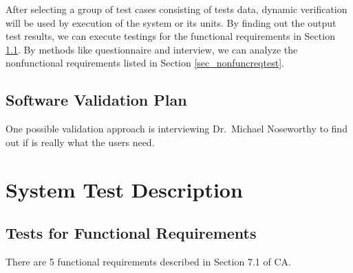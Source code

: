 \documentclass[12pt, titlepage]{article}
\begin{document}
    After selecting a group of test cases consisting of tests data, dynamic
verification will be used by execution of the system or its units. By finding
out the output test results, we can execute testings for the functional
requirements in Section \ref{sec_funcreqtest}. By methods like questionnaire and
interview, we can analyze the nonfunctional requirements listed in Section
\ref{sec_nonfuncreqtest}.

\subsection{Software Validation Plan}

One possible validation approach is interviewing Dr.\ Michael Noseworthy
 to find out if \progname{} is really what the users need.  

\section{System Test Description} \label{sec_systestdescri}

\subsection{Tests for Functional Requirements} \label{sec_funcreqtest}

There are 5 functional requirements described in Section 7.1 of CA. 
\end{document}
